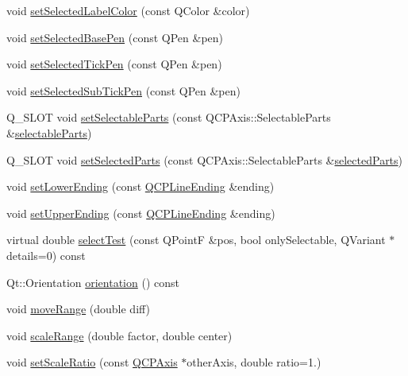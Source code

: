 \begin{DoxyCompactItemize}
\item 
void \hyperlink{class_q_c_p_axis_a5d502dec597c634f491fdd73d151c72d}{set\-Selected\-Label\-Color} (const Q\-Color \&color)
\item 
void \hyperlink{class_q_c_p_axis_aeb917a909215605b95ef2be843de1ee8}{set\-Selected\-Base\-Pen} (const Q\-Pen \&pen)
\item 
void \hyperlink{class_q_c_p_axis_a8360502685eb782edbf04019c9345cdc}{set\-Selected\-Tick\-Pen} (const Q\-Pen \&pen)
\item 
void \hyperlink{class_q_c_p_axis_a2a00a7166600155eac26843132eb9576}{set\-Selected\-Sub\-Tick\-Pen} (const Q\-Pen \&pen)
\item 
Q\-\_\-\-S\-L\-O\-T void \hyperlink{class_q_c_p_axis_a513f9b9e326c505d9bec54880031b085}{set\-Selectable\-Parts} (const Q\-C\-P\-Axis\-::\-Selectable\-Parts \&\hyperlink{class_q_c_p_axis_ad2bff3d2ed3d35c10d44c0c02441bd2c}{selectable\-Parts})
\item 
Q\-\_\-\-S\-L\-O\-T void \hyperlink{class_q_c_p_axis_ab9d7a69277dcbed9119b3c1f25ca19c3}{set\-Selected\-Parts} (const Q\-C\-P\-Axis\-::\-Selectable\-Parts \&\hyperlink{class_q_c_p_axis_a08323248a1cba4750ef07ceea159e0b3}{selected\-Parts})
\item 
void \hyperlink{class_q_c_p_axis_a08af1c72db9ae4dc8cb8a973d44405ab}{set\-Lower\-Ending} (const \hyperlink{class_q_c_p_line_ending}{Q\-C\-P\-Line\-Ending} \&ending)
\item 
void \hyperlink{class_q_c_p_axis_a69119b892fc306f651763596685aa377}{set\-Upper\-Ending} (const \hyperlink{class_q_c_p_line_ending}{Q\-C\-P\-Line\-Ending} \&ending)
\item 
virtual double \hyperlink{class_q_c_p_axis_a2877a6230920c118be65c6113089f467}{select\-Test} (const Q\-Point\-F \&pos, bool only\-Selectable, Q\-Variant $\ast$details=0) const 
\item 
Qt\-::\-Orientation \hyperlink{class_q_c_p_axis_a57483f2f60145ddc9e63f3af53959265}{orientation} () const 
\item 
void \hyperlink{class_q_c_p_axis_a18f3a68f2b691af1fd34b6593c886630}{move\-Range} (double diff)
\item 
void \hyperlink{class_q_c_p_axis_a7072ff96fe690148f1bbcdb4f773ea1c}{scale\-Range} (double factor, double center)
\item 
void \hyperlink{class_q_c_p_axis_af4bbd446dcaee5a83ac30ce9bcd6e125}{set\-Scale\-Ratio} (const \hyperlink{class_q_c_p_axis}{Q\-C\-P\-Axis} $\ast$other\-Axis, double ratio=1.)
\item 

\end{DoxyCompactItemize}
